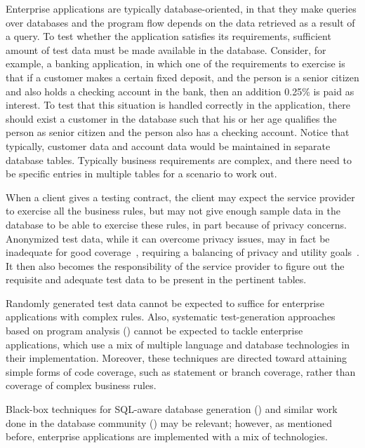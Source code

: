 
Enterprise applications are typically database-oriented, in that they make
queries over databases and the program flow depends on the data retrieved as a
result of a query.  To test whether the application satisfies its requirements,
sufficient amount of test data must be made available in the database. Consider,
for example, a banking application, in which one of the requirements to exercise
is that if a customer makes a certain fixed deposit, and the person is a senior
citizen and also holds a checking account in the bank, then an addition 0.25\%
is paid as interest. To test that this situation is handled correctly in the
application, there should exist a customer in the database such that his or her
age qualifies the person as senior citizen and the person also has a checking
account. Notice that typically, customer data and account data would be
maintained in separate database tables. Typically business requirements are
complex, and there need to be specific entries in multiple tables for a scenario
to work out.

When a client gives a testing contract, the client may expect the service
provider to exercise all the business rules, but may not give enough sample data
in the database to be able to exercise these rules, in part because of privacy
concerns. Anonymized test data, while it can overcome privacy issues, may in
fact be inadequate for good coverage~\cite{Grechanik:2010}, requiring a
balancing of privacy and utility goals~\cite{Taneja:2011}.  It then also becomes
the responsibility of the service provider to figure out the requisite and
adequate test data to be present in the pertinent tables.

Randomly generated test data cannot be expected to suffice for enterprise
applications with complex rules. Also, systematic test-generation approaches
based on program analysis (\eg \cite{Emmi:2007,Li:2010,Marcozzi:2012,Pan:2011})
cannot be expected to tackle enterprise applications, which use a mix of
multiple language and database technologies in their implementation. Moreover,
these techniques are directed toward attaining simple forms of code coverage,
such as statement or branch coverage, rather than coverage of complex business
rules.

Black-box techniques for SQL-aware database generation (\eg \cite{Adir:2011,
delaRiva:2010, Khalek:2008}) and similar work done in the database community
(\eg \cite{Arasu:2011, Binnig:2007b}) may be relevant; however, as mentioned
before, enterprise applications are implemented with a mix of technologies.

